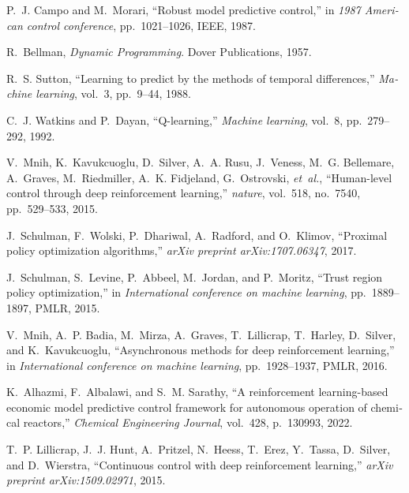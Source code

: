 \documentclass[12pt,a4paper]{report}
\begin{document}
	
	
	\begin{thebibliography}{10}
		\begin{latin}
			
		
		P.~J. Campo and M.~Morari, ``Robust model predictive control,'' in {\em 1987
			American control conference}, pp.~1021--1026, IEEE, 1987.
		
		R.~Bellman, {\em {Dynamic Programming}}.
		\newblock Dover Publications, 1957.
		
		R.~S. Sutton, ``Learning to predict by the methods of temporal differences,''
		{\em Machine learning}, vol.~3, pp.~9--44, 1988.
		
		C.~J. Watkins and P.~Dayan, ``Q-learning,'' {\em Machine learning}, vol.~8,
		pp.~279--292, 1992.
		
		V.~Mnih, K.~Kavukcuoglu, D.~Silver, A.~A. Rusu, J.~Veness, M.~G. Bellemare,
		A.~Graves, M.~Riedmiller, A.~K. Fidjeland, G.~Ostrovski, {\em et~al.},
		``Human-level control through deep reinforcement learning,'' {\em nature},
		vol.~518, no.~7540, pp.~529--533, 2015.
		
		J.~Schulman, F.~Wolski, P.~Dhariwal, A.~Radford, and O.~Klimov, ``Proximal
		policy optimization algorithms,'' {\em arXiv preprint arXiv:1707.06347},
		2017.
		
		J.~Schulman, S.~Levine, P.~Abbeel, M.~Jordan, and P.~Moritz, ``Trust region
		policy optimization,'' in {\em International conference on machine learning},
		pp.~1889--1897, PMLR, 2015.
		
		V.~Mnih, A.~P. Badia, M.~Mirza, A.~Graves, T.~Lillicrap, T.~Harley, D.~Silver,
		and K.~Kavukcuoglu, ``Asynchronous methods for deep reinforcement learning,''
		in {\em International conference on machine learning}, pp.~1928--1937, PMLR,
		2016.
		
		K.~Alhazmi, F.~Albalawi, and S.~M. Sarathy, ``A reinforcement learning-based
		economic model predictive control framework for autonomous operation of
		chemical reactors,'' {\em Chemical Engineering Journal}, vol.~428, p.~130993,
		2022.
		
		T.~P. Lillicrap, J.~J. Hunt, A.~Pritzel, N.~Heess, T.~Erez, Y.~Tassa,
		D.~Silver, and D.~Wierstra, ``Continuous control with deep reinforcement
		learning,'' {\em arXiv preprint arXiv:1509.02971}, 2015.
		

\end{latin}
\end{thebibliography}
\end{document}
